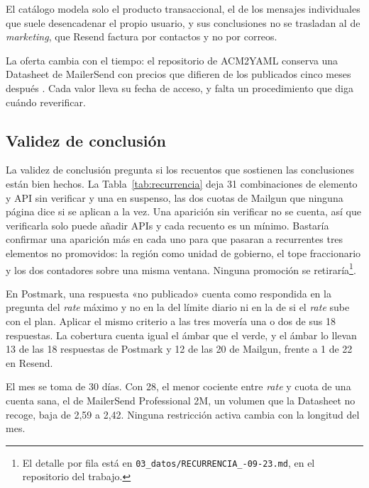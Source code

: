 El catálogo modela solo el producto transaccional, el de los mensajes individuales que suele desencadenar el propio usuario, y sus conclusiones no se trasladan al de \textit{marketing}, que Resend factura por contactos y no por correos.

La oferta cambia con el tiempo: el repositorio de ACM2YAML conserva una Datasheet de MailerSend con precios que difieren de los publicados cinco meses después \citep{apisconsumptionmodel}.
Cada valor lleva su fecha de acceso, y falta un procedimiento que diga cuándo reverificar.

\subsection{Validez de conclusión}\label{sec:conclusiones:conclusion}

La validez de conclusión pregunta si los recuentos que sostienen las conclusiones están bien hechos.
La Tabla~\ref{tab:recurrencia} deja 31 combinaciones de elemento y API sin verificar y una en suspenso, las dos cuotas de Mailgun que ninguna página dice si se aplican a la vez.
Una aparición sin verificar no se cuenta, así que verificarla solo puede añadir APIs y cada recuento es un mínimo.
Bastaría confirmar una aparición más en cada uno para que pasaran a recurrentes tres elementos no promovidos: la región como unidad de gobierno, el tope fraccionario y los dos contadores sobre una misma ventana.
Ninguna promoción se retiraría\footnote{El detalle por fila está en \texttt{03\_datos/\allowbreak RECURRENCIA\_-09-23.md}, en el repositorio del trabajo.}.

En Postmark, una respuesta «no publicado» cuenta como respondida en la pregunta del \textit{rate} máximo y no en la del límite diario ni en la de si el \textit{rate} sube con el plan.
Aplicar el mismo criterio a las tres movería una o dos de sus 18 respuestas.
La cobertura cuenta igual el ámbar que el verde, y el ámbar lo llevan 13 de las 18 respuestas de Postmark y 12 de las 20 de Mailgun, frente a 1 de 22 en Resend.

El mes se toma de 30 días.
Con 28, el menor cociente entre \textit{rate} y cuota de una cuenta sana, el de MailerSend Professional 2M, un volumen que la Datasheet no recoge, baja de 2,59 a 2,42.
Ninguna restricción activa cambia con la longitud del mes.
